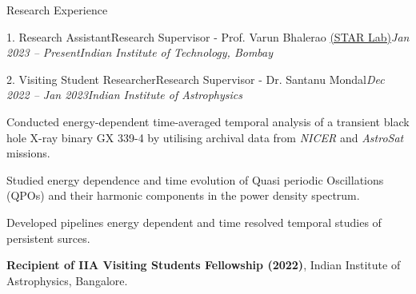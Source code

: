 \begin{section}{Research Experience}
\begin{subsection}{1. Research Assistant}{Research Supervisor - Prof. Varun Bhalerao \href{https://www.star-iitb.in/home}{(STAR Lab)}}{\textit{Jan 2023 -- Present}}{\textit{Indian Institute of Technology, Bombay}}
    \end{subsection}
\vspace{-0.1em}
    \begin{subsection}{2. Visiting Student Researcher}{Research Supervisor - Dr. Santanu Mondal}{\textit{Dec 2022 -- Jan 2023}}{\textit{Indian Institute of Astrophysics}}
        \vspace{0.5em}
        \item Conducted energy-dependent time-averaged temporal analysis of a transient black hole X-ray binary GX 339-4 by utilising archival data from \textit{NICER} and \textit{AstroSat} missions.
        \item Studied energy dependence and time evolution of Quasi periodic Oscillations (QPOs) and their harmonic components in the power density spectrum. 
        \item Developed pipelines energy dependent and time resolved temporal studies of persistent surces. 
        \item \textbf{Recipient of IIA Visiting Students Fellowship (2022)}, Indian Institute of Astrophysics, Bangalore.
    \end{subsection}
\end{section}
